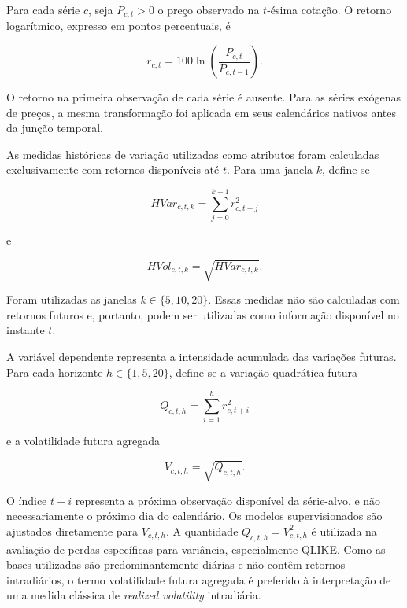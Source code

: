 \documentclass[a4paper,fleqn]{cas-sc}
\begin{document}
Para cada série \(c\), seja \(P_{c,t}>0\) o preço observado na \(t\)-ésima cotação. O retorno logarítmico, expresso em pontos percentuais, é

\begin{equation}
r_{c,t}=100\ln\left(\frac{P_{c,t}}{P_{c,t-1}}\right).
\label{eq:log_return}
\end{equation}

O retorno na primeira observação de cada série é ausente. Para as séries exógenas de preços, a mesma transformação foi aplicada em seus calendários nativos antes da junção temporal.

As medidas históricas de variação utilizadas como atributos foram calculadas exclusivamente com retornos disponíveis até \(t\). Para uma janela \(k\), define-se

\begin{equation}
HVar_{c,t,k}=\sum_{j=0}^{k-1}r_{c,t-j}^{2}
\label{eq:hist_var}
\end{equation}

e

\begin{equation}
HVol_{c,t,k}=\sqrt{HVar_{c,t,k}}.
\label{eq:hist_vol}
\end{equation}

Foram utilizadas as janelas \(k\in\{5,10,20\}\). Essas medidas não são calculadas com retornos futuros e, portanto, podem ser utilizadas como informação disponível no instante \(t\).

A variável dependente representa a intensidade acumulada das variações futuras. Para cada horizonte \(h\in\{1,5,20\}\), define-se a variação quadrática futura

\begin{equation}
Q_{c,t,h}=\sum_{i=1}^{h}r_{c,t+i}^{2}
\label{eq:forward_variance}
\end{equation}

e a volatilidade futura agregada

\begin{equation}
V_{c,t,h}=\sqrt{Q_{c,t,h}}.
\label{eq:forward_vol}
\end{equation}

O índice \(t+i\) representa a próxima observação disponível da série-alvo, e não necessariamente o próximo dia do calendário. Os modelos supervisionados são ajustados diretamente para \(V_{c,t,h}\). A quantidade \(Q_{c,t,h}=V_{c,t,h}^{2}\) é utilizada na avaliação de perdas específicas para variância, especialmente QLIKE. Como as bases utilizadas são predominantemente diárias e não contêm retornos intradiários, o termo volatilidade futura agregada é preferido à interpretação de uma medida clássica de \textit{realized volatility} intradiária.
\end{document}
